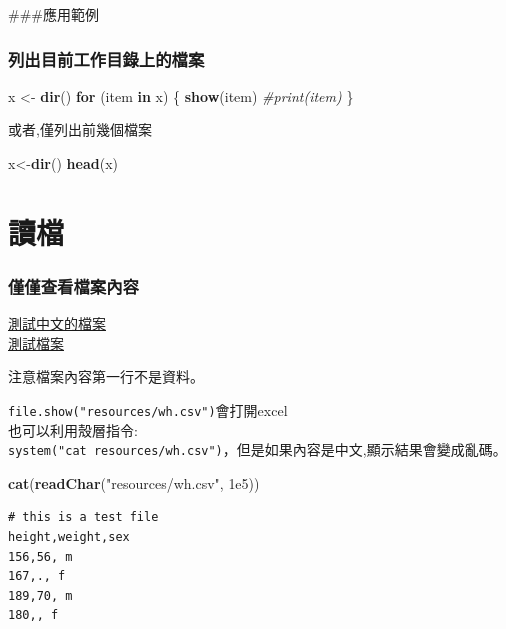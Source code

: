 \documentclass[]{book}
\newenvironment{Shaded}{\begin{snugshade}}{\end{snugshade}}
\newcommand{\CommentTok}[1]{\textcolor[rgb]{0.56,0.35,0.01}{\textit{#1}}}
\newcommand{\ControlFlowTok}[1]{\textcolor[rgb]{0.13,0.29,0.53}{\textbf{#1}}}
\newcommand{\FloatTok}[1]{\textcolor[rgb]{0.00,0.00,0.81}{#1}}
\newcommand{\KeywordTok}[1]{\textcolor[rgb]{0.13,0.29,0.53}{\textbf{#1}}}
\newcommand{\NormalTok}[1]{#1}
\newcommand{\StringTok}[1]{\textcolor[rgb]{0.31,0.60,0.02}{#1}}
\theoremstyle{definition}
\theoremstyle{definition}
\theoremstyle{definition}
\theoremstyle{remark}
\begin{document}
\#\#\#應用範例

\subsubsection{列出目前工作目錄上的檔案}

\begin{Shaded}
\begin{Highlighting}[]
\NormalTok{x <-}\StringTok{ }\KeywordTok{dir}\NormalTok{()}
\ControlFlowTok{for}\NormalTok{ (item }\ControlFlowTok{in}\NormalTok{ x) \{}
    \KeywordTok{show}\NormalTok{(item) }\CommentTok{#print(item)}
\NormalTok{\}}
\end{Highlighting}
\end{Shaded}

或者,僅列出前幾個檔案

\begin{Shaded}
\begin{Highlighting}[]
\NormalTok{x<-}\KeywordTok{dir}\NormalTok{()}
\KeywordTok{head}\NormalTok{(x)}
\end{Highlighting}
\end{Shaded}

\section{讀檔}

\subsubsection{僅僅查看檔案內容}

\href{resources/wh_chinese.csv}{測試中文的檔案}\\
\href{resources/wh.csv}{測試檔案}

注意檔案內容第一行不是資料。

\texttt{file.show("resources/wh.csv")}會打開excel\\
也可以利用殼層指令:\\
\texttt{system("cat\ resources/wh.csv")}，但是如果內容是中文,顯示結果會變成亂碼。

\begin{Shaded}
\begin{Highlighting}[]
\KeywordTok{cat}\NormalTok{(}\KeywordTok{readChar}\NormalTok{(}\StringTok{"resources/wh.csv"}\NormalTok{, }\FloatTok{1e5}\NormalTok{))}
\end{Highlighting}
\end{Shaded}

\begin{verbatim}
# this is a test file
height,weight,sex
156,56, m
167,., f
189,70, m
180,, f
\end{verbatim}
\end{document}
